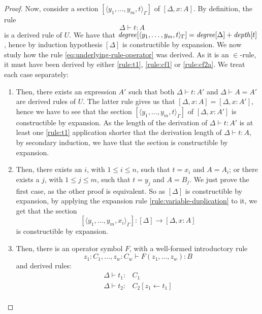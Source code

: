 \begin{proof}
    Now, consider a section $[\langle y_1, \dots, y_m, t \rangle_\Gamma]$ of $[\Delta, x \colon A]$. By definition, the rule 
    \begin{equation}
        \Delta \vdash t \colon A \label{eq:underlying-rule-operator}
    \end{equation} 
    is a derived rule of $U$. We have that $\operatorname{\mathit{degree}}[\langle y_1, \dots, y_m, t \rangle_\Gamma] = \operatorname{\mathit{degree}}[\Delta] + \operatorname{\mathit{depth}}[t]$, hence 
    by induction hypothesis $[\Delta]$ is constructible by expansion. 
    We now study how the rule \eqref{eq:underlying-rule-operator} was derived. 
    As it is an $\in$-rule, it must have been derived by either \ref{rule:t1}, \ref{rule:cf1} or \ref{rule:cf2a}.
    We treat each case separately:
    \begin{enumerate}
        \item[\ref{rule:t1}] Then, there exists an expression $A'$ such that both $\Delta \vdash t \colon A'$ and $\Delta \vdash A = A'$ are derived rules of $U$.
            The latter rule gives us that $[\Delta, x \colon A] = [\Delta, x \colon A']$, hence we have to see that the section $[\langle y_1, \dots, y_m, t \rangle_\Gamma]$ of $[\Delta, x \colon A']$ is constructible by expansion.
            As the length of the derivation of $\Delta \vdash t \colon A'$ is at least one \ref{rule:t1} application shorter that the derivation length of $\Delta \vdash t \colon A$, by secondary induction, we have that the section is constructible by expansion.
        \item[\ref{rule:cf1}] Then, there exists an $i$, with $1 \leq i \leq n$, such that $t = x_i$ and $A = A_i$;
            or there exists a $j$, with $1 \leq j \leq m$, such that $t = y_j$ and $A = B_j$.
            We just prove the first case, as the other proof is equivalent. So as $[\Delta]$ is constructible by expansion,
            by applying the expansion rule \ref{rule:variable-duplication} to it, we get that the section \[
                [\langle y_1, \dots, y_m, x_i \rangle_\Gamma] \colon [\Delta] \to [\Delta, x \colon A]
            \] is constructible by expansion.
        \item[\ref{rule:cf2a}]  Then, there is an operator symbol $F$, with a well-formed introductory rule \[
                z_1 \colon C_1, \dots, z_w \colon C_w \vdash F(z_1, \dots, z_w) \colon B
            \] and derived rules:
            \begin{align*}
                \Delta \vdash t_1 \colon& C_1 \\
                \Delta \vdash t_2 \colon& C_2[z_1  \leftarrow  t_1] \\

\end{align*}
\end{enumerate}
\end{proof}
